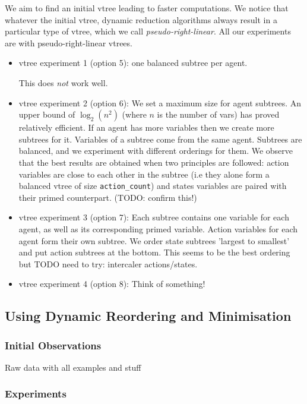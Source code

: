 \documentclass[11pt]{article}
\begin{document}
We aim to find an initial vtree leading to faster computations. We notice that whatever the initial vtree, dynamic reduction algorithms always result in a particular type of vtree, which we call \textit{pseudo-right-linear}. 
All our experiments are with pseudo-right-linear vtrees.
\begin{itemize}
\item vtree experiment 1 (option 5): one balanced subtree per agent. 

This does \textit{not} work well.
\item vtree experiment 2 (option 6): We set a maximum size for agent subtrees. An upper bound of $\log_2(n^2)$ (where $n$ is the number of vars) has proved relatively efficient. If an agent has more variables then we create more subtrees for it. Variables of a subtree come from the same agent. Subtrees are balanced, and we experiment with different orderings for them. We observe that the best results are obtained when two principles are followed: action variables are close to each other in the subtree (i.e they alone form a balanced vtree of size \texttt{action\_count}) and states variables are 
paired with their primed counterpart. (TODO: confirm this!)

\item vtree experiment 3 (option 7): Each subtree contains one variable for each agent, as well as its corresponding primed variable. Action variables for each agent form their own subtree. We order state subtrees 'largest to smallest' and put action subtrees at the bottom. This seems to be the best ordering but TODO need to try: intercaler actions/states.

\item vtree experiment 4 (option 8): Think of something! 

\end{itemize}

\subsection{Using Dynamic Reordering and Minimisation}

\subsubsection{Initial Observations}

Raw data with all examples and stuff 

\subsubsection{Experiments}
\end{document}
